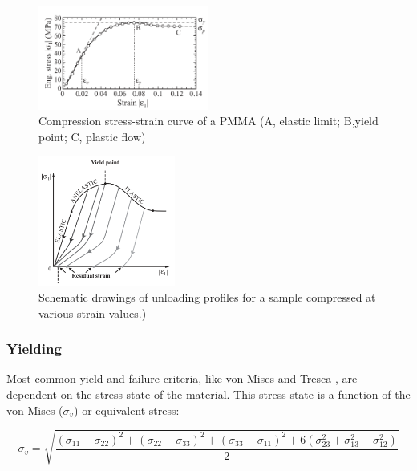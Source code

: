 \begin{figure}[H]
    \centering
    \includegraphics[width=0.5\textwidth]{chapter_2/figures/SSPMMA.png}
    \caption{Compression stress-strain curve of a PMMA (A, elastic limit; B,yield point; C, plastic flow)\cite{Halary2011PolymerMaterials}}
    \label{fig:SSPMMA}
   \end{figure}
\begin{figure}[H]
    \centering
    \includegraphics[width=0.4\textwidth]{chapter_2/figures/SSresidual.png}
    \caption{Schematic drawings of unloading profiles for a sample compressed at various strain values.)\cite{Halary2011PolymerMaterials}}
    \label{fig:SSPMMA}
   \end{figure}
\subsubsection{Yielding}
Most common yield and failure criteria, like von Mises and Tresca \cite{Christensen2013TheFailure}, are dependent on the stress state of the material. This stress state is a function of the von Mises ($\sigma_v$) or equivalent stress:

\begin{equation}\label{von mises}
\sigma_v=\sqrt{\frac{(\sigma_{11}-\sigma_{22})^2+(\sigma_{22}-\sigma_{33})^2+(\sigma_{33}-\sigma_{11})^2 +6(\sigma_{23}^2+\sigma_{13}^2+\sigma_{12}^2)}{2}} 
\end{equation}


